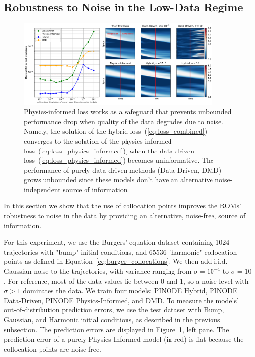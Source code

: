\subsection{Robustness to Noise in the Low-Data Regime}
\label{sec:burger_noise}
\begin{figure}[t]
    \centering
    \includegraphics[width=0.9\textwidth]{figures/burgers_noise.pdf}
    \caption{Physics-informed loss works as a safeguard that prevents unbounded performance drop when quality of the data degrades due to noise. Namely, the solution of the hybrid loss~(\ref{eq:loss_combined}) converges to the solution of the physics-informed loss~(\ref{eq:loss_physics_informed}), when the data-driven loss~(\ref{eq:loss_physics_informed}) becomes uninformative. The performance of purely data-driven methods (Data-Driven, DMD) grows unbounded since these models don't have an alternative noise-independent source of information.}
    \label{fig:burger_noise}
\end{figure}

In this section we show that the use of collocation points improves the ROMs' robustness to noise in the data by providing an alternative, noise-free, source of information.

For this experiment, we use the Burgers' equation dataset containing 1024 trajectories with "bump" initial conditions, and 65536 "harmonic" collocation points as defined in Equation~\ref{eq:burger_collocations}. We then add i.i.d. Gaussian noise to the trajectories, with variance ranging from $\sigma = 10^{-4}$ to $\sigma = 10$. For reference, most of the data values lie between $0$ and $1$, so a noise level with $\sigma > 1$ dominates the data. We train four models: PINODE Hybrid, PINODE Data-Driven, PINODE Physics-Informed, and DMD. To measure the models' out-of-distribution prediction errors, we use the test dataset with Bump, Gaussian, and Harmonic initial conditions, as described in the previous subsection. The prediction errors are displayed in Figure~\ref{fig:burger_noise}, left pane. The prediction error of a purely Physics-Informed model (in red) is flat because the collocation points are noise-free. 

